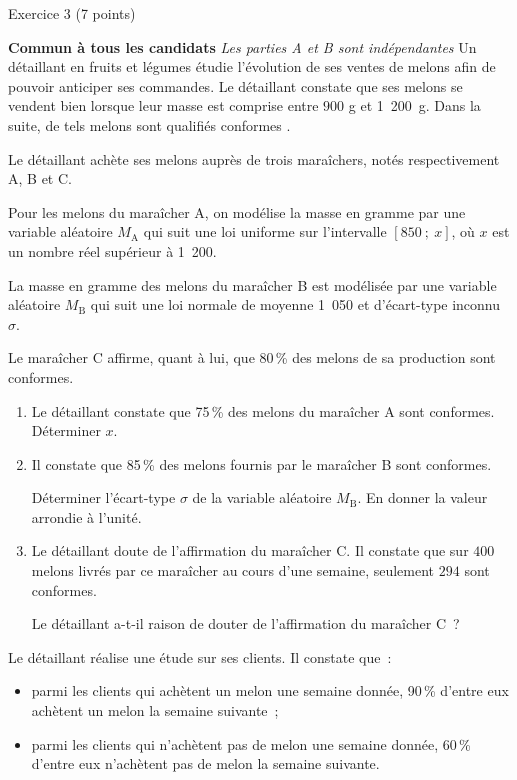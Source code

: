 
\begin{h2}Exercice 3 (7 points)\end{h2}
\textbf{Commun à  tous les candidats}
\medskip
\emph{Les parties A  et B sont indépendantes}
\medskip
Un détaillant en fruits et légumes étudie l'évolution de ses ventes de melons afin de pouvoir
anticiper ses commandes.
\bigskip
{}
\medskip
Le détaillant constate que ses melons se vendent bien lorsque leur masse est comprise entre $900$ g et
1~200~g. Dans la suite, de tels melons sont qualifiés \og conformes \fg.
\par
Le détaillant achète ses melons auprès de trois maraîchers, notés respectivement A, B et C.
\par
Pour les melons du maraîcher A, on modélise la masse en gramme par une variable aléatoire $M_{\text{A}}$
qui suit une loi uniforme sur l'intervalle $[850~;~x]$, où $x$ est un nombre réel supérieur à 1~200.
\par
La masse en gramme des melons du maraîcher B est modélisée par une variable aléatoire $M_{\text{B}}$ qui
suit une loi normale de moyenne 1~050 et d'écart-type inconnu $\sigma$.
\par
Le maraîcher C affirme, quant à lui, que 80\,\% des melons de sa production sont conformes.
\medskip
\begin{enumerate}
     \item Le détaillant constate que 75\,\% des melons du maraîcher A sont conformes. Déterminer $x$.
     \item Il constate que 85\,\% des melons fournis par le maraîcher B sont conformes.
     \par
     Déterminer l'écart-type $\sigma$ de la variable aléatoire $M_{\text{B}}$. En donner la valeur arrondie à l'unité.
     \item  Le détaillant doute de l'affirmation du maraîcher C. Il constate que sur $400$ melons livrés par ce
     maraîcher au cours d'une semaine, seulement $294$ sont conformes.
     \par
     Le détaillant a-t-il raison de douter de l'affirmation du maraîcher C~?
\end{enumerate}
\bigskip
{}
\medskip
Le détaillant réalise une étude sur ses clients. Il constate que~:
\begin{itemize}
     \item parmi les clients qui achètent un melon une semaine donnée, 90\,\% d'entre eux achètent un
     melon la semaine suivante~;
     \item parmi les clients qui n'achètent pas de melon une semaine donnée, 60\,\% d'entre eux n'achètent
     pas de melon la semaine suivante.
\end{itemize}
